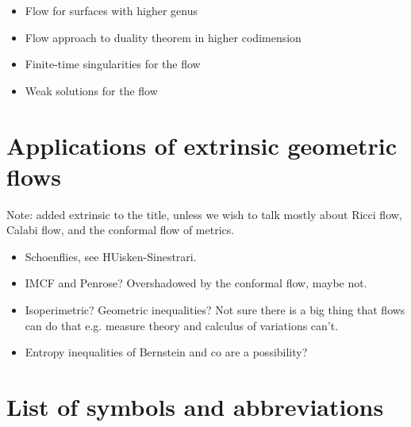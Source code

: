 \documentclass{amsart}
\theoremstyle{definition}
\begin{document}
\begin{refsection}

\begin{itemize}
\item Flow for surfaces with higher genus
\item Flow approach to duality theorem in higher codimension
\item Finite-time singularities for the flow
\item Weak solutions for the flow
\end{itemize}

\printbibliography[heading=subbibliography]
\end{refsection}

\section{Applications of extrinsic geometric flows}

\begin{refsection}
Note: added extrinsic to the title, unless we wish to talk mostly about Ricci flow, Calabi flow, and the conformal flow of metrics.

\begin{itemize}
\item Schoenflies, see HUisken-Sinestrari.
\item IMCF and Penrose? Overshadowed by the conformal flow, maybe not.
\item Isoperimetric? Geometric inequalities? Not sure there is a big thing that flows can do that e.g. measure theory and calculus of variations can't.
\item Entropy inequalities of Bernstein and co are a possibility?
\end{itemize}

\printbibliography[heading=subbibliography]
\end{refsection}

\section{List of symbols and abbreviations}
\end{document}
